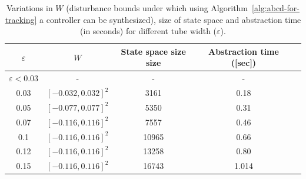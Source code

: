 \begin{table}[h!]
	\centering
	\caption{Variations in $W$ (disturbance bounds under which using Algorithm~\ref{alg:abcd-for-tracking} a controller can be synthesized), size of state space and abstraction time (in seconds) for different tube width ($\varepsilon$).}
	\vspace{1mm}
	\begin{tabular}{|c|c|c|c|c|}
		\hline
		$\varepsilon$ &  $W$  & State space size size & Abstraction time ([sec])  \\
		\hline
		$\varepsilon<0.03$  & -    & -  & -  \\
		\hline
		0.03   & $[-0.032,0.032]^2$    & 3161  & 0.18  \\
		\hline
		0.05   & $[-0.077,0.077]^2$   & 5350  & 0.31  \\
		\hline
		0.07    & $[-0.116,0.116]^2$  & 7557  & 0.46  \\
		\hline
		0.1  &  $[-0.116,0.116]^2$   & 10965  & 0.66  \\
		\hline
		0.12    & $[-0.116,0.116]^2$  & 13258  & 0.80  \\
		\hline
		0.15   &$[-0.116,0.116]^2$  & 16743     & 1.014 \\
		\hline
	\end{tabular}
	\label{tab:inv_pend}
\end{table}
